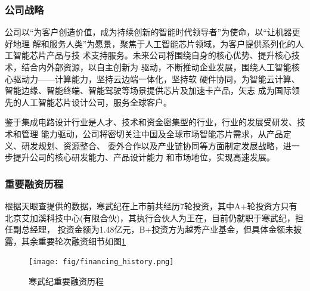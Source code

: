 \subsubsection{公司战略}
公司以“为客户创造价值，成为持续创新的智能时代领导者”为使命，以“让机器更好地理
解和服务人类”为愿景，聚焦于人工智能芯片领域，为客户提供系列化的人工智能芯片产品与技
术支持服务。未来公司将围绕自身的核心优势、提升核心技术，结合内外部资源，以自主创新为
驱动，不断推动企业发展，围绕人工智能核心驱动力——计算能力，坚持云边端一体化，坚持软
硬件协同，为智能云计算、智能边缘、智能终端、智能驾驶等场景提供芯片及加速卡产品，矢志
成为国际领先的人工智能芯片设计公司，服务全球客户。\par
鉴于集成电路设计行业是人才、技术和资金密集型的行业，行业的发展受研发、技术和管理
能力驱动，公司将密切关注中国及全球市场智能芯片需求，从产品定义、研发规划、资源整合、
委外合作以及产业链协同等方面制定发展战略，进一步提升公司的核心研发能力、产品设计能力
和市场地位，实现高速发展。
\subsubsection{重要融资历程}
根据天眼查提供的数据，寒武纪在上市前共经历7轮投资，其中A+轮投资方只有北京艾加溪科技中心(有限合伙)，其执行合伙人为王在，目前仍就职于寒武纪，担任副总经理，
投资金额为1.48亿元，B+投资方为越秀产业基金，但具体金额未披露，其余重要轮次融资细节如图\ref{financing_history}
\begin{figure}[h]
    \centering
    \texttt{[image: fig/financing\_history.png]}
    \caption{寒武纪重要融资历程}
    \label{financing_history}
\end{figure}

